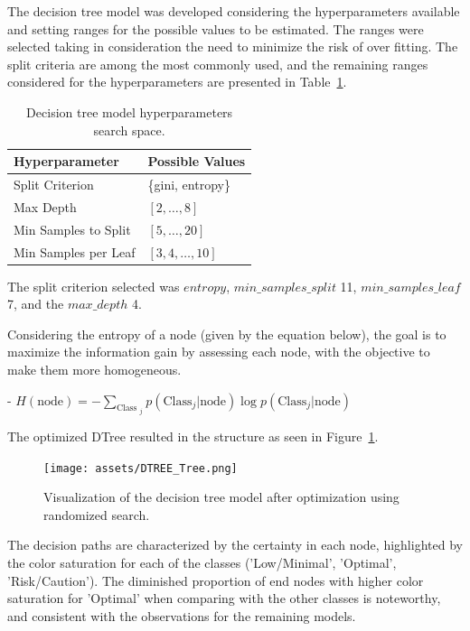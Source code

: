 \documentclass[conference]{IEEEtran}
\begin{document}
The decision tree model was developed considering the hyperparameters available and setting ranges for the possible values to be estimated. The ranges were selected taking in consideration the need to minimize the risk of over fitting. The split criteria are among the most commonly used, and the remaining ranges considered for the hyperparameters are presented in Table~\ref{parametrosDTree}.


\begin{table}[H]
\centering
\caption{Decision tree model hyperparameters search space.}
\label{parametrosDTree}
\begin{tabular}{ll}
\toprule
\textbf{Hyperparameter} & \textbf{Possible Values} \\
\midrule
Split Criterion & \{gini, entropy\} \\ 
Max Depth & $[2, \dots, 8]$ \\ 
Min Samples to Split & $[5, \dots, 20]$ \\ 
Min Samples per Leaf & $[3, 4, \dots, 10]$ \\
\bottomrule
\end{tabular}
\end{table}

The split criterion selected was $entropy$, $min\_samples\_split$ 11, $min\_samples\_leaf$ 7, and the $max\_depth$ 4.


Considering the entropy of a node (given by the equation below), the goal is to maximize the information gain by assessing each node, with the objective to make them more homogeneous. 

    - $H(\text{node}) = - \sum_{\text{Class }_j} p(\text{Class}_j | \text{node}) \log p(\text{Class}_j | \text{node})$


The optimized DTree resulted in the structure as seen in Figure~\ref{dtree_tree}.

\begin{figure}[H]
    \centering
    \texttt{[image: assets/DTREE\_Tree.png]}
    \caption{Visualization of the decision tree model after optimization using randomized search.}
    \label{dtree_tree}
\end{figure}

The decision paths are characterized by the certainty in each node, highlighted by the color saturation for each of the classes ('Low/Minimal', 'Optimal', 'Risk/Caution'). The diminished proportion of end nodes with higher color saturation for 'Optimal' when comparing with the other classes is noteworthy, and consistent with the observations for the remaining models.
\end{document}
